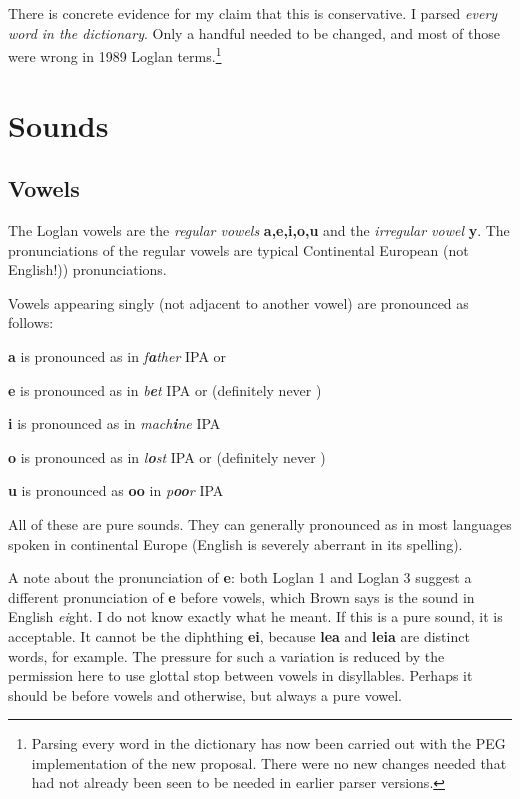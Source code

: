 \documentclass[12pt]{book}
\begin{document}
There is concrete evidence for my claim that this is conservative.  I parsed {\em every word in the dictionary\/}.  Only a handful needed to be changed,
and most of those were wrong in 1989 Loglan terms.\footnote{Parsing every word in the dictionary has now been carried out with the PEG implementation of the new proposal.  There were no new changes needed that had not already been seen to be needed in earlier parser versions.}

\section{Sounds}

\subsection{Vowels}

The Loglan vowels are the {\em regular vowels} {\bf a,e,i,o,u} and the {\em irregular vowel} {\bf y}.  The pronunciations of the regular vowels are typical Continental European (not English!)) pronunciations.

Vowels appearing singly (not adjacent to another vowel) are pronounced as follows:

{\bf a} is pronounced as in {\em f{\bf a}ther\/}  IPA  or 

{\bf e} is pronounced as in {\em b{\bf e}t\/} IPA  or   (definitely never )

{\bf i} is pronounced as in {\em mach{\bf i}ne\/} IPA 

{\bf o} is pronounced as in {\em l{\bf o}st\/} IPA  or  (definitely never )

{\bf u} is pronounced as {\bf oo} in {\em p{\bf oo}r}  IPA 

All of these are pure sounds.   They can generally pronounced as  in most languages spoken in continental Europe (English is severely aberrant in its spelling).

A note about the pronunciation of {\bf e}:  both Loglan 1 and Loglan 3 suggest a different pronunciation of {\bf e} before vowels, which Brown says is the sound in English {\em ei\/}ght.  I do not know exactly what he meant.  If this is a pure sound, it is acceptable.  It cannot be the diphthing {\bf ei}, because {\bf lea} and {\bf leia} are distinct words, for example.  The pressure for such a variation is reduced by the permission here to use glottal stop between vowels in disyllables.  Perhaps it should be  before vowels and  otherwise, but always a pure vowel.
\end{document}
